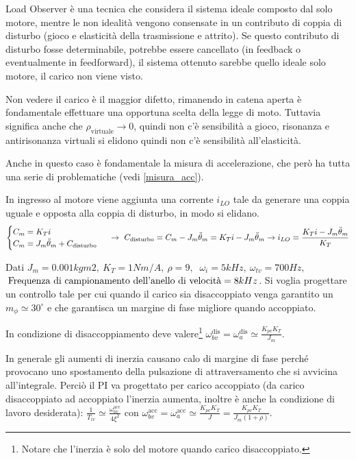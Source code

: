 Load Observer è una tecnica che considera il sistema ideale composto dal solo motore, mentre le non idealità vengono consensate in un contributo di coppia di disturbo (gioco e elasticità della trasmissione e attrito).
Se questo contributo di disturbo fosse determinabile, potrebbe essere cancellato (in feedback o eventualmente in feedforward), il sistema ottenuto sarebbe quello ideale solo motore, il carico non viene visto.

Non vedere il carico è il maggior difetto, rimanendo in catena aperta è fondamentale effettuare una opportuna scelta della legge di moto.
Tuttavia significa anche che \(\rho_\text{virtuale} \rightarrow 0\), quindi non c'è sensibilità a gioco, risonanza e antirisonanza virtuali si elidono quindi non c'è sensibilità all'elasticità.

Anche in questo caso è fondamentale la misura di accelerazione, che però ha tutta una serie di problematiche (vedi \ref{misura_acc}).

In ingresso al motore viene aggiunta una corrente \(i_{LO}\) tale da generare una coppia uguale e opposta alla coppia di disturbo, in modo si elidano.
\[\begin{cases}
    C_m = K_T i \\
    C_m = J_m \Ddot{\theta}_m + C_\text{disturbo}
\end{cases} \ \rightarrow \ C_\text{disturbo} = C_m - J_m \Ddot{\theta}_m = K_T i - J_m \Ddot{\theta}_m \rightarrow i_{LO} = \frac{K_T i - J_m \Ddot{\theta}_m}{K_T} \]  

Dati \(J_m=0.001 kgm2, \ K_T=1 Nm/A, \ \rho = 9, \) \( \ \omega_i = 5 kHz, \ \omega_{tv}=700 Hz, \) \( \, \text{Frequenza di campionamento \allowbreak dell’anello di velocità} = 8 kHz\).
Si voglia progettare un controllo tale per cui quando il carico sia disaccoppiato venga garantito un \(m_\phi \simeq 30^\circ\) e che garantisca un margine di fase migliore quando accoppiato.

In condizione di disaccoppiamento deve valere\footnote{Notare che l'inerzia è solo del motore quando carico disaccoppiato.} \(\omega_{bv}^\text{dis} = \omega_a^\text{dis} \simeq \frac{K_{pv}K_T}{J_m}\).

In generale gli aumenti di inerzia causano calo di margine di fase perché provocano uno spostamento della pulsazione di attraversamento che si avvicina all'integrale. Perciò il PI va progettato per carico accoppiato (da carico disaccoppiato ad accoppiato l'inerzia aumenta, inoltre è anche la condizione di lavoro desiderata): \(\frac{1}{T_{iv}} \simeq \frac{\omega_{bv}^\text{acc}}{4\xi^2}\) con \(\omega_{bv}^\text{acc} = \omega_{a}^\text{acc} \simeq \frac{K_{pv}K_T}{J} = \frac{K_{pv}K_T}{J_m (1+\rho)}\).


